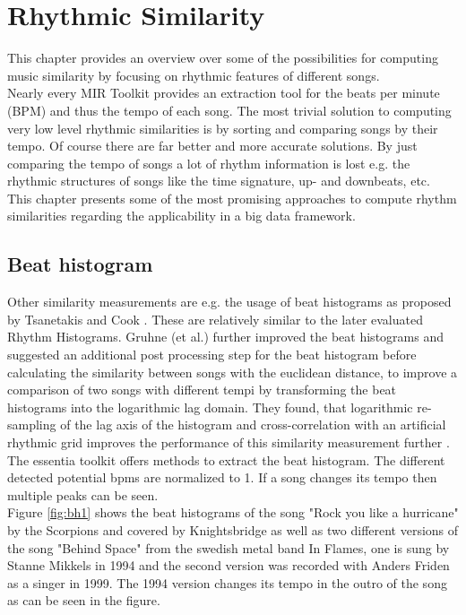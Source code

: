 
\section{Rhythmic Similarity}\label{rhythmsimc}

This chapter provides an overview over some of the possibilities for computing music similarity by focusing on rhythmic features of different songs. \\
Nearly every MIR Toolkit provides an extraction tool for the beats per minute (BPM) and thus the tempo of each song. The most trivial solution to computing very low level rhythmic similarities is by sorting and comparing songs by their tempo. Of course there are far better and more accurate solutions. By just comparing the tempo of songs a lot of rhythm information is lost e.g. the rhythmic structures of songs like the time signature, up- and downbeats, etc.\\ 
This chapter presents some of the most promising approaches to compute rhythm similarities regarding the applicability in a big data framework.\\

\subsection{Beat histogram}\label{beathist}

Other similarity measurements are e.g. the usage of beat histograms as proposed by Tsanetakis and Cook \cite{rhythm3}. These are relatively similar to the later evaluated Rhythm Histograms.
Gruhne (et al.) further improved the beat histograms and suggested an additional post processing step for the beat histogram before calculating the similarity between songs with the euclidean distance, to improve a comparison of two songs with different tempi by transforming the beat histograms into the logarithmic lag domain. They found, that logarithmic re-sampling of the lag axis of the histogram and cross-correlation with an artificial rhythmic grid improves the performance of this similarity measurement further \cite[182]{rbh1}.
The essentia toolkit offers methods to extract the beat histogram. The different detected potential bpms are normalized to 1. If a song changes its tempo then multiple peaks can be seen.\\ 
Figure \ref{fig:bh1} shows the beat histograms of the song "Rock you like a hurricane" by the Scorpions and covered by Knightsbridge as well as two different versions of the song "Behind Space" from the swedish metal band In Flames, one is sung by Stanne Mikkels in 1994 and the second version was recorded with Anders Friden as a singer in 1999. The 1994 version changes its tempo in the outro of the song as can be seen in the figure.

